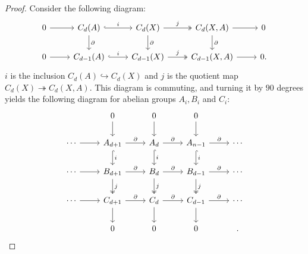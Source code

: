\documentclass{amsart}
\begin{document}
\begin{proof}
Consider the following diagram:
\begin{equation}
\begin{tikzcd}
0 \arrow[r] & C_d(A) \arrow[r, "i", hook] \arrow[d, "\partial"] & C_d(X) \arrow[r, "j", two heads] \arrow[d, "\partial"] & {C_d(X,A)} \arrow[r] \arrow[d, "\partial"] & 0 \\
0 \arrow[r] & C_{d-1}(A) \arrow[r, "i", hook]                               & C_{d-1}(X) \arrow[r, "j", two heads]                               & {C_{d-1}(X,A)} \arrow[r]                               & 0.
\end{tikzcd}
\end{equation}
$i$ is the inclusion $C_d(A) \hookrightarrow C_d(X)$ and $j$ is the quotient map $C_d(X) \twoheadrightarrow C_d(X,A)$. This diagram is commuting, and turning it by $90$ degrees yields the following diagram for abelian groups $A_i, B_i$ and $C_i$:
\begin{equation}
\begin{tikzcd}
                 & 0 \arrow[d]                                                         & 0 \arrow[d]                                                     & 0 \arrow[d]                                                         &        \\
\cdots \arrow[r] & A_{d+1} \arrow[r, "\partial"] \arrow[d, "i", hook]      & A_d \arrow[r, "\partial"] \arrow[d, "i", hook]      & A_{n-1} \arrow[r, "\partial"] \arrow[d, "i", hook]      & \cdots \\
\cdots \arrow[r] & B_{d+1} \arrow[r, "\partial"] \arrow[d, "j", two heads] & B_d \arrow[r, "\partial"] \arrow[d, "j", two heads] & B_{d-1} \arrow[r, "\partial"] \arrow[d, "j", two heads] & \cdots \\
\cdots \arrow[r] & C_{d+1} \arrow[r, "\partial"] \arrow[d]                             & C_d \arrow[r, "\partial"] \arrow[d]                             & C_{d-1} \arrow[r, "\partial"] \arrow[d]                             & \cdots \\
                 & 0                                                                   & 0                                                               & 0                                                                   &       .
\end{tikzcd}
\end{equation}

\end{proof}
\end{document}
